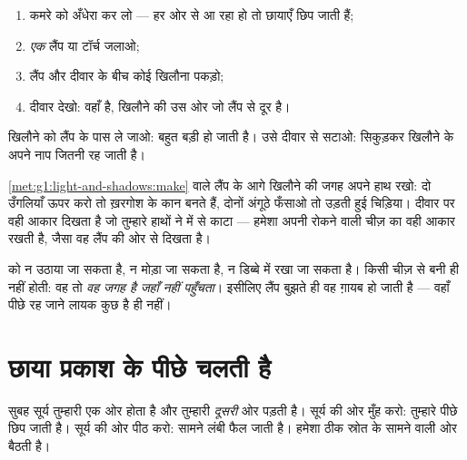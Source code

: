\begin{method}[साफ़ छाया कैसे बनाएँ]\label{met:g1:light-and-shadows:make}
\begin{enumerate}
  \item कमरे को अँधेरा कर लो ---  हर ओर से आ रहा हो तो छायाएँ
        छिप जाती हैं;
  \item \emph{एक} लैंप या टॉर्च जलाओ;
  \item लैंप और दीवार के बीच कोई खिलौना पकड़ो;
  \item दीवार देखो: वहाँ  है, खिलौने की उस ओर जो लैंप से दूर
        है।
\end{enumerate}
खिलौने को लैंप के पास ले जाओ:  बहुत बड़ी हो जाती है। उसे दीवार से
सटाओ:  सिकुड़कर खिलौने के अपने नाप जितनी रह जाती है।
\end{method}

\begin{example}\label{ex:g1:light-and-shadows:animals}
\cref{met:g1:light-and-shadows:make} वाले लैंप के आगे खिलौने की जगह
अपने हाथ रखो: दो उँगलियाँ ऊपर करो तो ख़रगोश के कान बनते हैं, दोनों
अंगूठे फँसाओ तो उड़ती हुई चिड़िया। दीवार पर वही आकार दिखता है जो
तुम्हारे हाथों ने  में से काटा ---  हमेशा अपनी रोकने वाली
चीज़ का वही आकार रखती है, जैसा वह लैंप की ओर से दिखता है।
\end{example}

\begin{remark}[छाया कोई चीज़ नहीं है]\label{rem:g1:light-and-shadows:notathing}
 को न उठाया जा सकता है, न मोड़ा जा सकता है, न डिब्बे में रखा जा
सकता है।  किसी चीज़ से बनी ही नहीं होती: वह तो \emph{वह जगह है
जहाँ  नहीं पहुँचता}। इसीलिए लैंप बुझते ही वह ग़ायब हो जाती है
--- वहाँ पीछे रह जाने लायक कुछ है ही नहीं।
\end{remark}

\section{छाया प्रकाश के पीछे चलती है}

\begin{example}[छाया किस ओर है?]\label{ex:g1:light-and-shadows:opposite}
सुबह सूर्य तुम्हारी एक ओर होता है और तुम्हारी  \emph{दूसरी} ओर
पड़ती है। सूर्य की ओर मुँह करो:  तुम्हारे पीछे छिप जाती है।
सूर्य की ओर पीठ करो:  सामने लंबी फैल जाती है।  हमेशा ठीक
स्रोत के सामने वाली ओर बैठती है।
\end{example}

